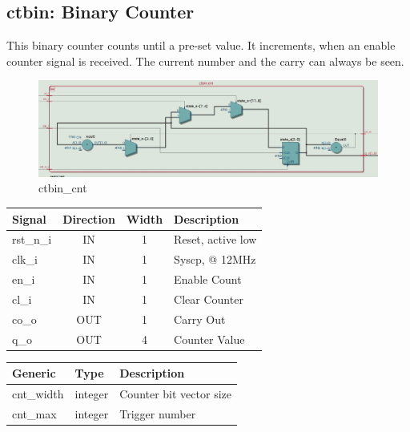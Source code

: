 \documentclass[12pt,a4 paper] {report}
\begin{document}
\newpage

\subsection{ctbin: Binary Counter}
This binary counter counts until a pre-set value. It increments, when an enable counter signal is received. The current 
number and the carry can always be seen.
\begin{figure}[h]
	\centering	
	\includegraphics[scale=0.3]{../png/ctbin_cnt.png}
	\caption{ctbin\_cnt}
\end{figure}
\begin{center}
	\begin{tabular}{ | p{2cm} | c | c | p{5cm} |}
		\hline
		\textbf{Signal} & \textbf{Direction} & \textbf{Width} & \textbf{Description} \\
		\hline	
 		 rst\_n\_i & IN & 1 & Reset, active low \\
 		 \hline
		clk\_i & IN & 1 & Syscp, @ 12MHz \\
		\hline
		en\_i & IN & 1 & Enable Count \\
		\hline
		cl\_i & IN & 1 & Clear Counter \\
		\hline
		co\_o & OUT & 1 & Carry Out \\
		\hline
		q\_o & OUT & 4 & Counter Value \\
		\hline
	\end{tabular}
\end{center}
\begin{center}
	\begin{tabular}{| p{2cm} | p{2cm} | p{4cm} |}
		\hline
		\textbf{Generic} & \textbf{Type} & \textbf{Description} \\
		\hline
 		cnt\_width & integer & Counter bit vector size \\
		\hline
		cnt\_max & integer & Trigger number \\
		\hline
	\end{tabular}	
\end{center}

\newpage
\end{document}

